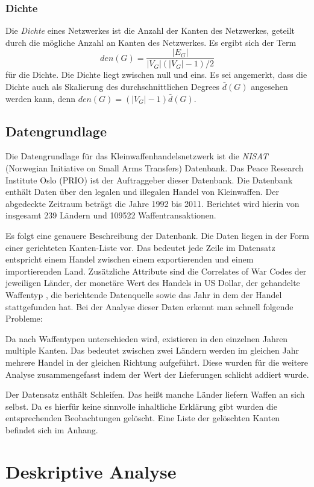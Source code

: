\documentclass[a4paper,ngerman,oneside,titlepage,bibliography=totoc,11pt]{scrreprt}
\begin{document}
\subsection{Dichte}
Die \emph{Dichte} eines Netzwerkes ist die Anzahl der Kanten des Netzwerkes, geteilt durch die mögliche Anzahl an Kanten des Netzwerkes. Es ergibt sich der Term $$den(G) = \frac{|E_G|}{|V_G|(|V_G|-1)/2}$$ für die Dichte. Die Dichte liegt zwischen null und eins. Es sei angemerkt, dass die Dichte auch als Skalierung des durchschnittlichen Degrees $\bar{d}(G)$ angesehen werden kann, denn $den(G) = (|V_G| - 1) \bar{d}(G)$.

\section{Datengrundlage}
Die Datengrundlage für das Kleinwaffenhandelsnetzwerk ist die \emph{NISAT} (Norwegian Initiative on Small Arms Transfers) Datenbank. Das Peace Research Institute Oslo (PRIO) ist der Auftraggeber dieser Datenbank. Die Datenbank enthält Daten über den legalen und illegalen Handel von Kleinwaffen. Der abgedeckte Zeitraum beträgt die Jahre 1992 bis 2011. Berichtet wird hierin von insgesamt 239 Ländern und 109522 Waffentransaktionen.

Es folgt eine genauere Beschreibung der Datenbank. Die Daten liegen in der Form einer gerichteten Kanten-Liste vor. Das bedeutet jede Zeile im Datensatz entspricht einem Handel zwischen einem exportierenden und einem importierenden Land. Zusätzliche Attribute sind die Correlates of War Codes der jeweiligen Länder, der monetäre Wert des Handels in US Dollar, der gehandelte Waffentyp , die berichtende Datenquelle sowie das Jahr in dem der Handel stattgefunden hat.
Bei der Analyse dieser Daten erkennt man schnell folgende Probleme:

Da nach Waffentypen unterschieden wird, existieren in den einzelnen Jahren multiple Kanten. Das bedeutet zwischen zwei Ländern werden im gleichen Jahr mehrere Handel in der gleichen Richtung aufgeführt. Diese wurden für die weitere Analyse zusammengefasst indem der Wert der Lieferungen schlicht addiert wurde.

Der Datensatz enthält Schleifen. Das heißt manche Länder liefern Waffen an sich selbst. Da es hierfür keine sinnvolle inhaltliche Erklärung gibt wurden die entsprechenden Beobachtungen gelöscht. Eine Liste der gelöschten Kanten befindet sich im Anhang.

\chapter{Deskriptive Analyse}
\end{document}
